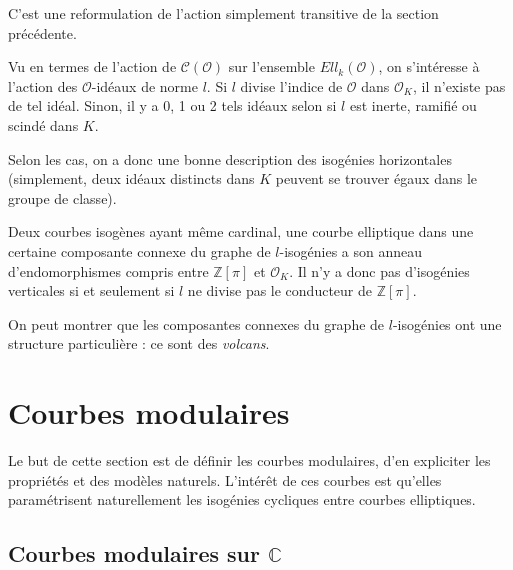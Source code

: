 \documentclass[11pt,a4paper]{article}
\newcommand{\Z}{\mathbb{Z}}
\newcommand{\C}{\mathbb{C}}
\renewcommand{\O}{\mathcal{O}}
\newcommand{\Cl}{\mathcal{C}}
\theoremstyle{definition}
\begin{document}
C'est une reformulation de l'action simplement transitive de la section précédente.

Vu en termes de l'action de $\Cl(\O)$ sur l'ensemble $Ell_k(\O)$, on s'intéresse à l'action des $\O$-idéaux de norme $l$. Si $l$ divise l'indice de $\O$ dans $\O_K$, il n'existe pas de tel idéal. Sinon, il y a 0, 1 ou 2 tels idéaux selon si $l$ est inerte, ramifié ou scindé dans $K$.

Selon les cas, on a donc une bonne description des isogénies horizontales (simplement, deux idéaux distincts dans $K$ peuvent se trouver égaux dans le groupe de classe).

Deux courbes isogènes ayant même cardinal, une courbe elliptique dans une certaine composante connexe du graphe de $l$-isogénies a son anneau d'endomorphismes compris entre $\Z[\pi]$ et $\O_K$. Il n'y a donc pas d'isogénies verticales si et seulement si $l$ ne divise pas le conducteur de $\Z[\pi]$.

On peut montrer que les composantes connexes du graphe de $l$-isogénies ont une structure particulière : ce sont des \emph{volcans}.





\newpage

\section{Courbes modulaires}


Le but de cette section est de définir les courbes modulaires, d'en expliciter les propriétés et des modèles naturels. L'intérêt de ces courbes est qu'elles paramétrisent naturellement les isogénies cycliques entre courbes elliptiques.



\subsection{Courbes modulaires sur $\C$}
\end{document}
